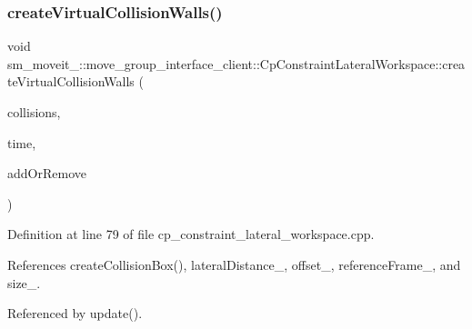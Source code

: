 \subsubsection{\texorpdfstring{create\+Virtual\+Collision\+Walls()}{createVirtualCollisionWalls()}}
{\footnotesize\ttfamily void sm\+\_\+moveit\+\_\+::move\+\_\+group\+\_\+interface\+\_\+client\+::\+Cp\+Constraint\+Lateral\+Workspace\+::create\+Virtual\+Collision\+Walls (\begin{DoxyParamCaption}\item[{std\+::vector$<$ moveit\+\_\+msgs\+::\+Collision\+Object $>$ \&}]{collisions,  }\item[{const ros\+::\+Time \&}]{time,  }\item[{int}]{add\+Or\+Remove }\end{DoxyParamCaption})}



Definition at line 79 of file cp\+\_\+constraint\+\_\+lateral\+\_\+workspace.\+cpp.



References create\+Collision\+Box(), lateral\+Distance\+\_\+, offset\+\_\+, reference\+Frame\+\_\+, and size\+\_\+.



Referenced by update().


